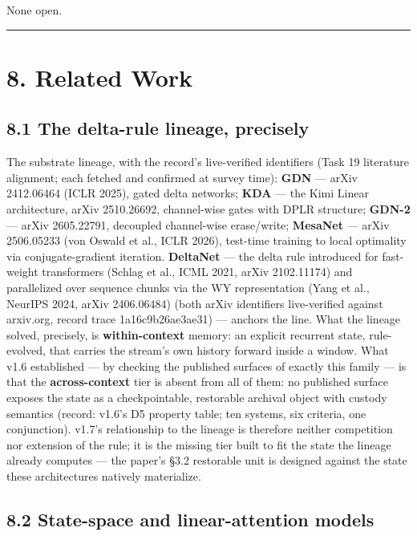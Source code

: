 \documentclass[11pt]{article}
\begin{document}
None open.

\begin{center}\rule{0.5\linewidth}{0.5pt}\end{center}

\section{8. Related Work}\label{related-work}

\subsection{8.1 The delta-rule lineage, precisely}\label{the-delta-rule-lineage-precisely}

The substrate lineage, with the record's live-verified identifiers (Task 19 literature alignment; each fetched and confirmed at survey time): \textbf{GDN} --- arXiv 2412.06464 (ICLR 2025), gated delta networks; \textbf{KDA} --- the Kimi Linear architecture, arXiv 2510.26692, channel-wise gates with DPLR structure; \textbf{GDN-2} --- arXiv 2605.22791, decoupled channel-wise erase/write; \textbf{MesaNet} --- arXiv 2506.05233 (von Oswald et al., ICLR 2026), test-time training to local optimality via conjugate-gradient iteration. \textbf{DeltaNet} --- the delta rule introduced for fast-weight transformers (Schlag et al., ICML 2021, arXiv 2102.11174) and parallelized over sequence chunks via the WY representation (Yang et al., NeurIPS 2024, arXiv 2406.06484) (both arXiv identifiers live-verified against arxiv.org, record trace 1a16c9b26ae3ae31) --- anchors the line. What the lineage solved, precisely, is \textbf{within-context} memory: an explicit recurrent state, rule-evolved, that carries the stream's own history forward inside a window. What v1.6 established --- by checking the published surfaces of exactly this family --- is that the \textbf{across-context} tier is absent from all of them: no published surface exposes the state as a checkpointable, restorable archival object with custody semantics (record: v1.6's D5 property table; ten systems, six criteria, one conjunction). v1.7's relationship to the lineage is therefore neither competition nor extension of the rule; it is the missing tier built to fit the state the lineage already computes --- the paper's \S{}3.2 restorable unit is designed against the state these architectures natively materialize.

\subsection{8.2 State-space and linear-attention models}\label{state-space-and-linear-attention-models}
\end{document}
